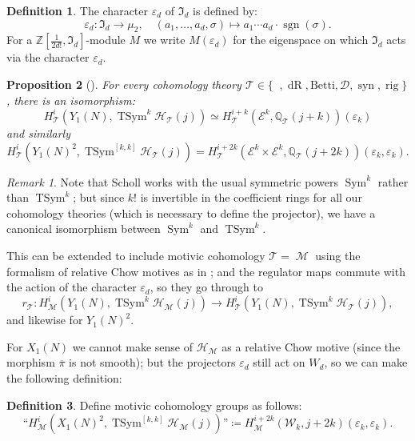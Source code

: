 \documentclass[11pt, a4paper, reqno]{amsart}
\theoremstyle{definition}
\newtheorem{definition}{Definition}[subsection]
\theoremstyle{plain}
\newtheorem{proposition}[definition]{Proposition}
\theoremstyle{remark}
\newtheorem*{remark}{Remark}
\DeclareMathOperator{\Sym}{Sym}
\DeclareMathOperator{\TSym}{TSym}
\DeclareMathOperator{\sgn}{sgn}
\DeclareMathOperator{\et}{\acute{e}t}
\DeclareMathOperator{\syn}{syn}
\DeclareMathOperator{\rig}{rig}
\DeclareMathOperator{\dR}{dR}
\DeclareMathOperator{\mot}{\mathscr{M}}
\newcommand{\numberset}{\mathbb}
\newcommand{\Q}{\numberset{Q}}
\newcommand{\Z}{\numberset{Z}}
\renewcommand{\epsilon}{\varepsilon}
\newcommand{\HS}{\mathscr{H}}
\newcommand{\ideal}{\mathfrak}
\newcommand{\Ell}{\mathcal{E}}
\newcommand{\KS}{\mathscr{W}}
\newcommand{\theory}{\mathcal{T}}
\newcommand{\del}{\mathcal{D}}
\newcommand{\regulator}[1]{r_{#1}}
\begin{document}
  \begin{definition}
   The character $\epsilon_d$ of $\ideal{I}_d$ is defined by:
   \[
    \epsilon_d \colon \ideal{I}_d \to \mu_2, \quad (a_1,\ldots,a_d,\sigma) \mapsto a_1\cdots a_d \cdot \sgn(\sigma).
   \]
   For a $\Z[\tfrac{1}{2d!}, \ideal{I}_d]$-module $M$ we write $M(\epsilon_d)$ for the eigenspace on which $\ideal{I}_d$ acts via the character $\epsilon_d$.
  \end{definition}

  \begin{proposition}[{\cite[Proposition~4.1.1]{scholl90}}]
   For every cohomology theory $\theory\in\{\et,\dR,\allowbreak\mathrm{Betti},\allowbreak\del,\syn,\rig\}$, there is an isomorphism:
   \[
    H_{\theory}^i(Y_1(N),\TSym^k \HS_{\theory}(j)) \simeq H_{\theory}^{i+k}(\Ell^k, \Q_{\theory}(j+k))(\epsilon_k)
   \]
   and similarly
   \[
    H^i_{\theory}(Y_1(N)^2, \TSym^{[k,k]} \HS_{\theory}(j)) = H^{i+2k}_{\theory}(\Ell^k \times \Ell^k,\Q_{\theory}(j+2k))(\epsilon_k, \epsilon_k).
   \]
  \end{proposition}
  
  \begin{remark}
   Note that Scholl works with the usual symmetric powers $\Sym^k$ rather than $\TSym^k$; but since $k!$ is invertible in the coefficient rings for all our cohomology theories (which is necessary to define the projector), we have a canonical isomorphism between $\Sym^k$ and $\TSym^k$.
  \end{remark}
  
  This can be extended to include motivic cohomology $\theory = \mot$ using the formalism of relative Chow motives as in \cite{ancona15}; and the regulator maps commute with the action of the character $\epsilon_d$, so they go through to
  \[
   \regulator{\theory} \colon H^i_{\mot}(Y_1(N),\TSym^k \HS_{\mot}(j)) \to H^i_{\theory}(Y_1(N),\TSym^k \HS_{\theory}(j)),
  \]
  and likewise for $Y_1(N)^2$.
  
  For $X_1(N)$ we cannot make sense of $\HS_{\mot}$ as a relative Chow motive (since the morphism $\overline{\pi}$ is not smooth); but the projectors $\epsilon_d$ still act on $W_d$, so we can make the following definition:

  \begin{definition}
   Define motivic cohomology groups as follows:
   \[
    \text{``} H^i_{\mot}(X_1(N)^2,\TSym^{[k,k]} \HS_{\mot}(j))\text{''} \coloneqq
    H^{i+2k}_{\mot}(\KS_k, j+2k)(\epsilon_k,\epsilon_k).  \]
  \end{definition}
\end{document}
